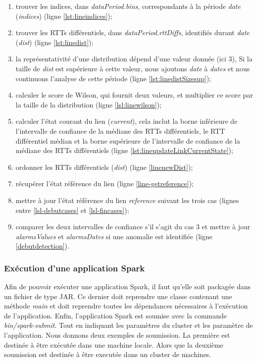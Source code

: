  \begin{enumerate}
 	\item trouver les indices,  dans \textit{dataPeriod.bins}, correspondants à la période \textit{date} (\textit{indices}) (ligne \ref{lst:lineindices});
 	
 	\item trouver les RTTs différentiels, dans \textit{dataPeriod.rttDiffs}, identifiés durant  \textit{date} (\textit{dist}) (ligne \ref{lst:linedist});
 	
 	\item la représentativité d'une distribution dépend d'une valeur donnée  (ici $3$), Si la taille de \textit{dist} est supérieure à cette valeur, nous ajoutons \textit{date} à \textit{dates} et nous continuons l'analyse de cette période (ligne \ref{lst:linedistSizesup});
 	\item calculer le score de Wilson, qui fournit deux valeurs, et multiplier ce score par la taille de la distribution  (ligne \ref{lsl:linewilson});
 	\item calculer l'état courant du lien (\textit{current}), cela inclut la borne inférieure de l'intervalle de confiance de la médiane des RTTs différentiels, le RTT différentiel médian et la borne supérieure de l'intervalle de confiance de la médiane des RTTs différentiels (ligne \ref{lst:lineupdateLinkCurrentState});
 	\item ordonner les RTTs différentiels (\textit{dist}) (ligne \ref{linenewDist});
 	\item récupérer l'état référence du lien (ligne \ref{line-getreference});
 	\item mettre à jour l'état référence du lien \textit{reference} suivant les trois cas (lignes entre \ref{lsl-debutcases} et \ref{lsl-fincases});
 	\item  comparer les deux intervalles de confiance s'il s'agit du cas $3$ et mettre à jour \textit{alarmsValues} et \textit{alarmsDates} si une anomalie est identifiée (ligne \ref{debutdetection}).
 	
 \end{enumerate}



\subsubsection{Exécution d'une application Spark} 

Afin de pouvoir exécuter une application Spark, il faut qu'elle soit packagée dans un fichier de type JAR. Ce dernier doit reprendre une classe contenant une méthode \textit{main} et doit reprendre toutes les dépendances nécessaires à l'exécution de l'application.  Enfin, l'application Spark  est soumise avec la commande \textit{bin/spark-submit}. Tout en indiquant les paramètres du cluster et les paramètre de l'application. Nous donnons deux exemples de soumission. La première est destinée à être exécutée dans une machine locale. Alors que la deuxième soumission est destinée à être executée dans un cluster de machines. 

